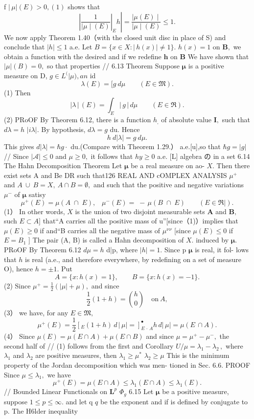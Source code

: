 f $\left|\,\mu\right|(E)>0,(1)$ shows that $$ \left|\frac{1}{\mid\mu\mid(E)}\right|_{E}h\left.\right|=\frac{\mid\mu(E)\mid}{\mid\mu\mid(E)}\leq1. $$ We now apply Theorem 1.40（with the closed unit disc in place of S) and conclude that $|h|\leq1$ a.e. Let $B=\{x\in X\colon|\,h(x)|\neq1\}.$ $h(x)=1$ on ${\boldsymbol{B}},$ we obtain a function with the desired and if we redefine $\boldsymbol{h}$ on $\boldsymbol{B}$ We have shown that $|\mu|(B)=0,$ so that properties // 6.13 Theorem Suppose $\boldsymbol{\mu}$ is a positive measure on D, $g\in L^{(}|\mu),a n$ id $$ \lambda(E)= [{g}~d\mu\qquad(E\in\mathfrak{M}). $$ (1) Then $$ |\lambda\,|\,(E)=\int_{E}|\,g\,|\,d\mu\qquad(E\in\Re). $$ (2) PRoOF By Theorem 6.12, there is a function $h_{\mathrm{,}}$ of absolute value $\mathbf{I},$ such that $d\lambda=h$ $|i\lambda|.$ By hypothesis, $d\lambda=g$ du. Hence $$ h~d|\lambda|=g~d\mu. $$ This gives $d|\lambda|=\hbar g\cdot$ du.(Compare with Theorem 1.29.） a.e.[u],so that $\hbar g=\left|g\right|$ // Since $\scriptstyle{|{\mathcal{A}}|\leq0}$ and $\mu\geq0,$ it follows that $\scriptstyle h y\geq0$ a.e. [L] algebra の in a set 6.14 The Hahn Decomposition Theorem Let ${\boldsymbol{\mu}}$ be a real measure on ao- $X.$ Then there exist sets A and Be DR such that126 REAL AND cOMPLEX ANALYSIS $\mu^{+}$ and $A\ \cup\ B=X,\ A\cap B=\emptyset,$ and such that the positive and negative variations $\mu^{-}$ of ${\boldsymbol{\mu}}$ satisy $$ \mu^{+}(E)=\mu(A\;\cap\;E),\;\;\;\mu^{-}(E)=\;-\,\mu(B\;\cap\;E)\;\;\;\;\;\;\;(E\in\Re|). $$ (1） In other words, $X$ is the union of two disjoint measurable sets ${\boldsymbol{A}}$ and ${\boldsymbol{B}},$ such $E\subset A]$ that“A carries all the positive mass of u”[since（1)）implies that $\mu(E)\geq0$ if and“B carries all the negative mass of $\mu^{\nu}\!^{\nu}$ [since $\mu(E)\leq0$ if $E=B_{1}$ ] The pair (A, B) is called a Hahn decomposition of $X.$ induced by ${\boldsymbol{\mu}}.$ PRoOF By Theorem 6.12 $\scriptstyle d\mu=h$ d|p, where $|h|=1.$ Since p ${\boldsymbol{\mu}}$ is real, it fol- lows that $\boldsymbol{\mathit{h}}$ is real (a.e., and therefore everywhere, by redefining on a set of measure O), hence $h=\pm1.$ Put $$ A=\{x\colon h(x)=1\},\qquad B=\{x\colon h(x)=-1\}. $$ (2) Since $\mu^{+}={\frac{1}{2}}(|\mu|+\mu),$ and since $$ {\textstyle\frac{1}{2}}(1+h)={\binom{h}{0}}\quad{\mathrm{on~}}A, $$ (3） we have, for any $E\in{\mathfrak{M}},$ $$ \mu^{+}(E)=\frac{1}{2}\left[_{E}(1+h)\,d\,|\,\mu|=\right]_{E\,\cdot\,A}^{\bullet}h\,d|\,\mu|=\mu(E\,\cap A). $$ (4） Since $\mu(E)=\mu(E\cap A)+\mu(E\cap B)$ and since $\mu=\mu^{+}-\mu^{-},$ the second half of // (1) follows from the first and Corollary $U/\mu=\lambda_{1}-\lambda_{2}\,,$ where $\lambda_{1}$ and $\lambda_{2}$ are positive measures, then $\lambda_{1}\geq\mu^{*}$ $\lambda_{2}\geq\mu$ This is the minimum property of the Jordan decomposition which was men- tioned in Sec. 6.6. PROOF Since $\mu\leq\lambda_{1},$ we have $$ \mu^{+}(E)=\mu(E\cap A)\leq\lambda_{1}(E\cap A)\leq\lambda_{1}(E). $$ // Bounded Linear Functionals on ${\boldsymbol{L}}^{p}$ $\Phi_{g}$ 6.15 Let ${\boldsymbol{\mu}}$ be a positive measure, suppose $1\leq p\leq\infty.$ and let q $\boldsymbol{\mathit{q}}$ be the exponent and if is defined by conjugate to p. The H6lder inequality 